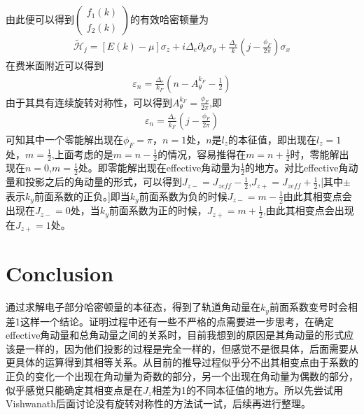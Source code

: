 \documentclass[22pt]{article}
\begin{document}
由此便可以得到$\begin{pmatrix}
	f_1(k) \\
	f_2(k)
\end{pmatrix}$的有效哈密顿量为
\begin{align}
	\tilde{\mathcal{H}}_j=[E(k)-\mu]\sigma_z+i\Delta_e\partial_k\sigma_y+\frac{\Delta_e}{k}(j-\frac{\phi_F}{2\pi})\sigma_x
\end{align}
在费米面附近可以得到
\begin{align}
	\varepsilon_n=\frac{\Delta_e}{k_{F}}(n-A_{\theta}^{k_{F}}-\frac{1}{2})
\end{align}
由于其具有连续旋转对称性，可以得到$A_{\theta}^{k_F}=\frac{\phi_F}{2\pi}$,即
\begin{align}
	\varepsilon_n=\frac{\Delta_e}{k_F}(j-\frac{\phi_F}{2\pi})
\end{align}
可知其中一个零能解出现在$\phi_F=\pi，n=1$处，$n$是$l_z$的本征值，即出现在$l_z=1$处，$m=\frac{1}{2}$,上面考虑的是$m=n-\frac{1}{2}$的情况，容易推得在$m=n+\frac{1}{2}$时，零能解出现在$n=0$,$m=\frac{1}{2}$处。即零能解出现在effective角动量为$\frac{1}{2}$的地方。对比effective角动量和投影之后的角动量的形式，可以得到$J_{z-}=J_{zeff}-\frac{1}{2}$,$J_{z+}=J_{zeff}+\frac{1}{2}$,[其中$\pm$表示$k_y$前面系数的正负。]即当$k_y$前面系数为负的时候$J_{z-}=m-\frac{1}{2}$由此其相变点会出现在$J_{z-}=0$处，当$k_y$前面系数为正的时候，$J_{z+}=m+\frac{1}{2}$,由此其相变点会出现在$J_{z+}=1$处。
\section*{Conclusion}
通过求解电子部分哈密顿量的本征态，得到了轨道角动量在$k_y$前面系数变号时会相差1这样一个结论。证明过程中还有一些不严格的点需要进一步思考，在确定effective角动量和总角动量之间的关系时，目前我想到的原因是其角动量的形式应该是一样的，因为他们投影的过程是完全一样的，但感觉不是很具体，后面需要从更具体的运算得到其相等关系。从目前的推导过程似乎分不出其相变点由于系数的正负的变化一个出现在角动量为奇数的部分，另一个出现在角动量为偶数的部分，似乎感觉只能确定其相变点是在$J_z$相差为1的不同本征值的地方。所以先尝试用Vishwanath后面讨论没有旋转对称性的方法试一试，后续再进行整理。
\end{document}
